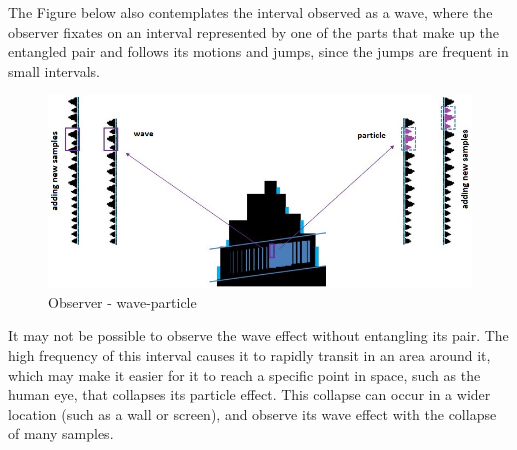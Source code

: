 The Figure below also contemplates the interval observed as a wave, where the observer fixates on an interval represented by one of the parts that make up the entangled pair and follows its motions and jumps, since the jumps are frequent in small intervals.
	\begin{figure}[H]
	\caption{Observer - wave-particle}
	\label{fig:consciousness_space_wave-particle}
	\centering
	\includegraphics[scale=.55]{sections/images/consciousness_space_wave-particle.jpg}
	\end{figure}

It may not be possible to observe the wave effect without entangling its pair. The high frequency of this interval causes it to rapidly transit in an area around it, which may make it easier for it to reach a specific point in space, such as the human eye, that collapses its particle effect. This collapse can occur in a wider location (such as a wall or screen), and observe its wave effect with the collapse of many samples.
